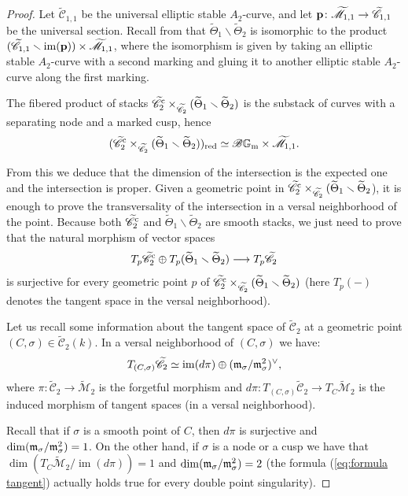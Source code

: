 \documentclass[a4paper, 10pt]{amsart}
\numberwithin{equation}{section}
\numberwithin{subsection}{section}
\theoremstyle{definition}
\theoremstyle{remark}
\renewcommand{\mathcal}{\mathscr}
\newcommand\GG{\mathbb{G}} \newcommand\HH{\mathbb{H}}
\newcommand\rmm{\mathrm{m}} \newcommand\rmn{\mathrm{n}}
\newcommand\arr{\ifinner\to\else\longrightarrow\fi}
\newcommand\im[1]{\operatorname{im}(#1)}
\renewcommand{\setminus}{\smallsetminus}
\newcommand{\gm}{\GG_{\rmm}}
\newcommand{\Mtilde}{\widetilde{\mathcal M}}
\newcommand{\Ctilde}{\widetilde{\mathcal C}}
\newcommand{\ThTilde}{\widetilde{\Theta}}
\begin{document}
	\begin{proof}
		Let $\Ctilde_{1,1}$ be the universal elliptic stable $A_2$-curve, and let $\bfp\colon\Mtilde_{1,1}\arr\Ctilde_{1,1}$ be the universal section.
		Recall from  that $\ThTilde_1\smallsetminus\ThTilde_2$ is isomorphic to the product $(\Ctilde_{1,1}\setminus \im{\bfp}) \times \Mtilde_{1,1}$, where the isomorphism is given by taking an elliptic stable $A_2$-curve with a second marking and gluing it to another elliptic stable $A_2$-curve along the first marking.
		
		The fibered product of stacks $\Ctilde_2^{\rm c} \times_{\Ctilde_2} (\ThTilde_1 \setminus \ThTilde_2)$ is the substack of curves with a separating node and a marked cusp, hence
		$$ (\Ctilde_2^{\rm c} \times_{\Ctilde_2} (\ThTilde_1 \setminus \ThTilde_2))_{\rm red} \simeq \cB\gm \times \Mtilde_{1,1}.$$
		
		From this we deduce that the dimension of the intersection is the expected one and the intersection is proper. Given a geometric point in $\Ctilde_2^{\rm c} \times_{\Ctilde_2} (\ThTilde_1 \setminus \ThTilde_2$), it is enough to prove the transversality of the intersection in a versal neighborhood of the point. Because both $\Ctilde_2^{\rm c}$ and $\ThTilde_1 \setminus \ThTilde_2$ are smooth stacks, we just need to prove that the natural morphism of vector spaces
		\begin{equation}\label{eq:trans} T_p \Ctilde_2^{\rm c} \oplus T_p (\ThTilde_1 \setminus \ThTilde_2) \longrightarrow T_p \Ctilde_2 \end{equation}
		is surjective for every geometric point $p$ of $\Ctilde_2^{\rm c} \times_{\Ctilde_2}(\ThTilde_1 \setminus \ThTilde_2)$ (here $T_p(-)$ denotes the tangent space in the versal neighborhood).
		
		Let us recall some information about the tangent space of $\Ctilde_2$ at a geometric point $(C,\sigma) \in \Ctilde_2(k)$. In a versal neighborhood of $(C,\sigma)$ we have:
		\begin{equation}\label{eq:formula tangent}
			T_{(C,\sigma)}\Ctilde_2\simeq\im{d\pi}\oplus(\frkm_{\sigma}/\frkm_{\sigma}^2)^\vee, 
		\end{equation}
		where $\pi\colon\Ctilde_2 \rightarrow \Mtilde_2$ is the forgetful morphism and $d\pi:T_{(C,\sigma)}\Ctilde_2 \rightarrow T_C\Mtilde_2$ is the induced morphism of tangent spaces (in a versal neighborhood).
		
		Recall that if $\sigma$ is a smooth point of $C$, then $d\pi$ is surjective and $\dim (\mathfrak{m}_{\sigma}/\mathfrak{m}_{\sigma}^2)=1$. On the other hand, if $\sigma$ is a node or a cusp we have that $\dim (T_{C}\Mtilde_2/\im{d\pi}) = 1$ and $\dim (\mathfrak{m}_{\sigma}/\mathfrak{m}_{\sigma}^2)=2$ (the formula (\ref{eq:formula tangent}) actually holds true for every double point singularity).
		

\end{proof}
\end{document}
